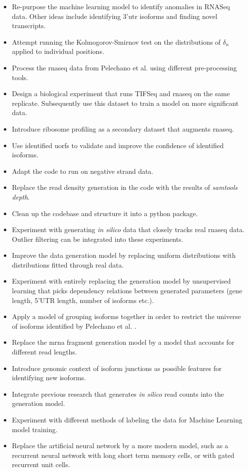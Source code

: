 \documentclass[12pt]{article}
\begin{document}
\begin{itemize}
    \item Re-purpose the machine learning model to identify anomalies in RNASeq data. Other ideas include identifying 3'\acrshort{utr} isoforms and finding novel transcripts.
    \item Attempt running the Kolmogorov-Smirnov test on the distributions of $\delta_n$ applied to individual positions. 
    \item Process the \acrshort{rnaseq} data from Pelechano et al. \cite{Pelechano2013} using different pre-processing tools.
    \item Design a biological experiment that runs TIFSeq and \acrshort{rnaseq} on the same replicate. Subsequently use this dataset to train a model on more significant data.
    \item Introduce ribosome profiling as a secondary dataset that augments \acrshort{rnaseq}.
    \item Use identified u\acrshort{orf}s to validate and improve the confidence of identified isoforms.
    \item Adapt the code to run on negative strand data.
    \item Replace the read density generation in the code with the results of \textit{samtools depth}. 
    \item Clean up the codebase and structure it into a python package.
    \item Experiment with generating \textit{in silico} data that closely tracks real \acrshort{rnaseq} data. Outlier filtering can be integrated into these experiments.
    \item Improve the data generation model by replacing uniform distributions with distributions fitted through real data.
    \item Experiment with entirely replacing the generation model by unsupervised learning that picks dependency relations between generated parameters (gene length, 5'UTR length, number of isoforms etc.). 
    \item Apply a model of grouping isoforms together in order to restrict the universe of isoforms identified by Pelechano et al. \cite{Pelechano2013}.
    \item Replace the \acrshort{mrna} fragment generation model by a model that accounts for different read lengths. 
    \item Introduce genomic context of isoform junctions as possible features for identifying new isoforms. 
    \item Integrate previous research that generates \textit{in silico} read counts into the generation model.
    \item Experiment with different methods of labeling the data for Machine Learning model training.
    \item Replace the artificial neural network by a more modern model, such as a recurrent neural network with long short term memory cells, or with gated recurrent unit cells.
\end{itemize}
\end{document}
